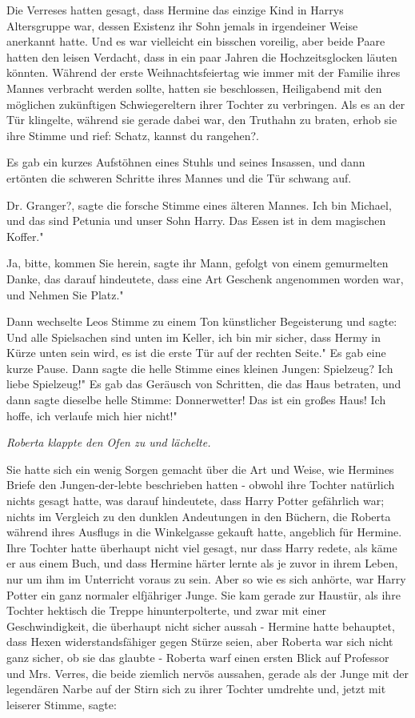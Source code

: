 Die Verreses hatten gesagt, dass Hermine das einzige Kind in Harrys Altersgruppe
war, dessen Existenz ihr Sohn jemals in irgendeiner Weise anerkannt hatte. Und
es war vielleicht ein bisschen voreilig, aber beide Paare hatten den leisen
Verdacht, dass in ein paar Jahren die Hochzeitsglocken läuten könnten. Während
der erste Weihnachtsfeiertag wie immer mit der Familie ihres Mannes verbracht
werden sollte, hatten sie beschlossen, Heiligabend mit den möglichen zukünftigen
Schwiegereltern ihrer Tochter zu verbringen. Als es an der Tür klingelte,
während sie gerade dabei war, den Truthahn zu braten, erhob sie ihre Stimme und
rief: \glqq Schatz, kannst du rangehen?\grqq{}.

Es gab ein kurzes Aufstöhnen eines Stuhls und seines Insassen, und dann ertönten
die schweren Schritte ihres Mannes und die Tür schwang auf.

\glqq Dr. Granger?\grqq{}, sagte die forsche Stimme eines älteren Mannes. \glqq
Ich bin Michael, und das sind Petunia und unser Sohn Harry. Das Essen ist in dem
magischen Koffer."

\glqq Ja, bitte, kommen Sie herein\grqq{}, sagte ihr Mann, gefolgt von einem
gemurmelten \glqq Danke\grqq{}, das darauf hindeutete, dass eine Art Geschenk
angenommen worden war, und \glqq Nehmen Sie Platz."

Dann wechselte Leos Stimme zu einem Ton künstlicher Begeisterung und sagte:
\glqq Und alle Spielsachen sind unten im Keller, ich bin mir sicher, dass Hermy
in Kürze unten sein wird, es ist die erste Tür auf der rechten Seite." Es gab
eine kurze Pause. Dann sagte die helle Stimme eines kleinen Jungen: \glqq
Spielzeug? Ich liebe Spielzeug!" Es gab das Geräusch von Schritten, die das Haus
betraten, und dann sagte dieselbe helle Stimme: \glqq Donnerwetter! Das ist ein
großes Haus! Ich hoffe, ich verlaufe mich hier nicht!"

\emph{Roberta klappte den Ofen zu und lächelte.}

Sie hatte sich ein wenig Sorgen gemacht über die Art und Weise, wie Hermines
Briefe den Jungen-der-lebte beschrieben hatten - obwohl ihre Tochter natürlich
nichts gesagt hatte, was darauf hindeutete, dass Harry Potter gefährlich war;
nichts im Vergleich zu den dunklen Andeutungen in den Büchern, die Roberta
während ihres Ausflugs in die Winkelgasse gekauft hatte, angeblich für Hermine.
Ihre Tochter hatte überhaupt nicht viel gesagt, nur dass Harry redete, als käme
er aus einem Buch, und dass Hermine härter lernte als je zuvor in ihrem Leben,
nur um ihm im Unterricht voraus zu sein. Aber so wie es sich anhörte, war Harry
Potter ein ganz normaler elfjähriger Junge. Sie kam gerade zur Haustür, als ihre
Tochter hektisch die Treppe hinunterpolterte, und zwar mit einer
Geschwindigkeit, die überhaupt nicht sicher aussah - Hermine hatte behauptet,
dass Hexen widerstandsfähiger gegen Stürze seien, aber Roberta war sich nicht
ganz sicher, ob sie das glaubte - Roberta warf einen ersten Blick auf Professor
und Mrs. Verres, die beide ziemlich nervös aussahen, gerade als der Junge mit
der legendären Narbe auf der Stirn sich zu ihrer Tochter umdrehte und, jetzt mit
leiserer Stimme, sagte:

